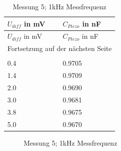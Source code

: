 \documentclass[12pt]{scrreprt} %
\begin{document}
\setlongtables
\begin{longtable}{| l | l |}
\hline
$U_{diff}$ in mV&$C_{Piezo}$ in nF\\
\hline
\endfirsthead
\hline
$U_{diff}$ in mV&$C_{Piezo}$ in nF\\
\hline
\endhead
\hline
\multicolumn{2}{|c|}{Fortsetzung auf der nächsten Seite}\\
\hline
\endfoot
\hline \hline
\caption{Messung 5; 1kHz Messfrequenz}\\
\endlastfoot
\hline
\label{tab:2.5}%
0.4&0.9705\\
1.4&0.9709\\
2.0&0.9690\\
3.0&0.9681\\
3.8&0.9675\\
5.0&0.9670\\
\end{longtable}

\begin {figure}[htbp]
      \begin{center}
      \end{center}
\caption{Messung 5; 1kHz Messfrequenz}
\label{fig:2.4}
\end{figure}
\end{document}

